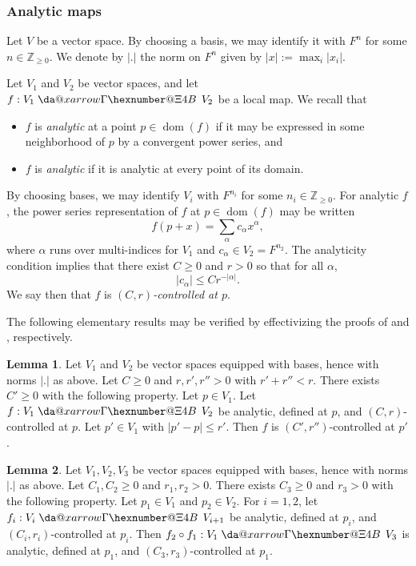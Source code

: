 \documentclass[reqno]{amsart}
\makeatletter
\newcommand*{\da@rightarrow}{\mathchar"0\hexnumber@\symAMSa 4B }
\newcommand*{\xdashrightarrow}[2][]{%
  \mathrel{%
    \mathpalette{\da@xarrow{#1}{#2}{}\da@rightarrow{\,}{}}{}%
  }%
}
\newcommand*{\da@xarrow}[7]{%
  \sbox0{$\ifx#7\scriptstyle\scriptscriptstyle\else\scriptstyle\fi#5#1#6\m@th$}%
  \sbox2{$\ifx#7\scriptstyle\scriptscriptstyle\else\scriptstyle\fi#5#2#6\m@th$}%
  \sbox4{$#7\dabar@\m@th$}%
  \dimen@=\wd0 %
  \ifdim\wd2 >\dimen@
    \dimen@=\wd2 %
  \fi
  \count@=2 %
  \def\da@bars{\dabar@\dabar@}%
  \@whiledim\count@\wd4<\dimen@\do{%
    \advance\count@\@ne
    \expandafter\def\expandafter\da@bars\expandafter{%
      \da@bars
      \dabar@ 
    }%
  }%
  \mathrel{#3}%
  \mathrel{%
    \mathop{\da@bars}\limits
    \ifx\\#1\\%
    \else
      _{\copy0}%
    \fi
    \ifx\\#2\\%
    \else
      ^{\copy2}%
    \fi
  }%
  \mathrel{#4}%
}
\DeclareMathOperator{\dom}{dom}
\theoremstyle{plain} \newtheorem{theorem} {Theorem}
\theoremstyle{definition} \newtheorem{definition} [theorem] {Definition}
\theoremstyle{itplain} %
\newtheorem{lemma}[theorem]{Lemma}
\numberwithin{equation}{section}
\numberwithin{theorem}{section}
\renewcommand{\geq}{\geqslant}
\renewcommand{\leq}{\leqslant}
\makeatother
\begin{document}
\subsubsection{Analytic maps}\label{sec:analytic-functions}
Let $V$ be a vector space.  By choosing a basis, we may identify it with $F^n$ for some $n \in \mathbb{Z}_{\geq 0}$.  We denote by $|.|$ the norm on $F^n$ given by $|x| := \max_{i} |x_i|$.

Let $V_1$ and $V_2$ be vector spaces, and let $f : V_1 \xdashrightarrow{} V_2$ be a local map.  We recall that
\begin{itemize}
\item $f$ is \emph{analytic} at a point $p \in \dom(f)$ if it may be expressed in some neighborhood of $p$ by a convergent power series, and
\item $f$ is \emph{analytic} if it is analytic at every point of its domain.
\end{itemize}
By choosing bases, we may identify $V_i$ with $F^{n_i}$ for some $n_i \in \mathbb{Z}_{\geq 0}$.  For analytic $f$, the power series representation of $f$ at $p \in \dom(f)$ may be written
\begin{equation}\label{eq:phip-+-x}
  f(p + x) = \sum _{\alpha } c_\alpha x^\alpha,
\end{equation}
where $\alpha$ runs over multi-indices for $V_1$ and $c_\alpha \in V_2 = F^{n_2}$.  The analyticity condition implies that there exist $C \geq 0$ and $r > 0$ so that for all $\alpha$,
\begin{equation}\label{eq:c_alpha-leq-c_0}
  |c_\alpha| \leq C r^{-|\alpha|}.
\end{equation}
We say then that $f$ is \emph{$(C,r)$-controlled at $p$}.

The following elementary results may be verified by effectivizing the proofs of \cite[p69, Theorem]{MR2179691} and \cite[p70, Theorem]{MR2179691}, respectively.
\begin{lemma}\label{lem:standard2:elementary-analytic-translate}
  Let $V_1$ and $V_2$ be vector spaces equipped with bases, hence with norms $|.|$ as above.  Let $C \geq 0$ and $r, r', r'' > 0$ with $r' + r'' < r$.  There exists $C' \geq 0$ with the following property.  Let $p \in V_1$.  Let $f : V_1 \xdashrightarrow{} V_2$ be analytic, defined at $p$, and $(C,r)$-controlled at $p$.  Let $p' \in V_1$ with $|p' - p| \leq r'$.  Then $f$ is $(C',r'')$-controlled at $p'$.
\end{lemma}
\begin{lemma}\label{lem:standard2:elementary-analytic-compose}
  Let $V_1, V_2, V_3$ be vector spaces equipped with bases, hence with norms $|.|$ as above.  Let $C_1, C_2 \geq 0$ and $r_1, r_2 > 0$.  There exists $C_3 \geq 0$ and $r_3 > 0$ with the following property.  Let $p_1 \in V_1$ and $p_2 \in V_2$.  For $i=1,2$, let $f_i : V_i \xdashrightarrow{} V_{i+1}$ be analytic, defined at $p_i$, and $(C_i,r_i)$-controlled at $p_i$.  Then $f_2 \circ f_1 : V_1 \xdashrightarrow{} V_3$ is analytic, defined at $p_1$, and $(C_3,r_3)$-controlled at $p_1$.
\end{lemma}
\end{document}
